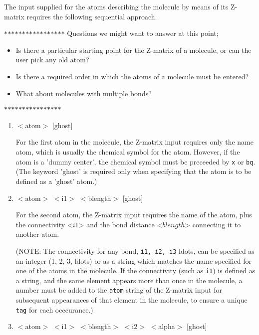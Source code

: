 The input supplied for the atoms describing the molecule by means of its
Z-matrix requires the following sequential approach.

\verb+*****************+
Questions we might want to answer at this point;
\begin{itemize}
\item Is there a particular starting point for the Z-matrix of a molecule,
or can the user pick any old atom?
\item Is there a required order in which the atoms of a molecule must be
entered?
\item What about molecules with multiple bonds?
\end{itemize}
\verb+****************+

\begin{enumerate}

   \item $<$atom$>$ [ghost]

    For the first atom in the molecule, the Z-matrix input requires only  
    the name atom, which is usually the chemical symbol for the atom.
    However, if the atom is a 'dummy center', the chemical symbol must
    be preceeded by \verb+x+ or \verb+bq+. (The keyword 'ghost' is required
    only when specifying that the atom is to be defined as a 'ghost' atom.)

   \item $<$atom$>$ $<$i1$>$ $<$blength$>$ [ghost]

    For the second atom, the Z-matrix input requires the name of the atom, 
    plus the connectivity <$i1$> and the bond distance <$blength$> 
    connecting it to another atom. 

    (NOTE: The connectivity for any bond, {\tt i1, i2, i3} ldots, 
    can be specified as an integer (1, 2, 3, ldots) or as a string 
    which matches the name specified for one of the atoms in the molecule.
    If the connectivity (such as {\tt i1}) is defined as a string,
    and the same element appears more than once in the molecule, a number
    must be added to the {\tt atom} string of the Z-matrix input for
    subsequent appearances of that element in the molecule, to ensure 
    a unique \verb+tag+ for each occcurance.)

   \item $<$atom$>$ $<$i1$>$ $<$blength$>$ $<$i2$>$ $<$alpha$>$ [ghost]


\end{enumerate}
